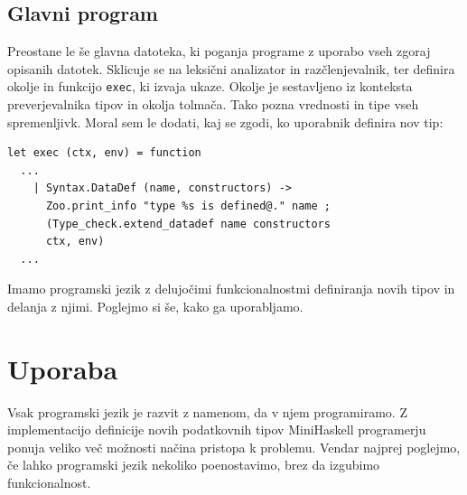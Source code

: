 \documentclass[a4paper,12pt,openright]{book}
\begin{document}
\section{Glavni program}
Preostane le še glavna datoteka, ki poganja programe z uporabo vseh zgoraj opisanih datotek. Sklicuje se na leksični analizator in razčlenjevalnik, ter definira okolje in funkcijo \lstinline{exec}, ki izvaja ukaze. Okolje je sestavljeno 
iz konteksta preverjevalnika tipov in okolja tolmača. Tako pozna vrednosti in tipe vseh spremenljivk. Moral sem le dodati, kaj se zgodi, ko uporabnik definira nov tip:
\begin{lstlisting}
let exec (ctx, env) = function
  ...
    | Syntax.DataDef (name, constructors) ->
      Zoo.print_info "type %s is defined@." name ;
      (Type_check.extend_datadef name constructors 
      ctx, env)
  ...
\end{lstlisting}

Imamo programski jezik z delujočimi funkcionalnostmi definiranja novih tipov in delanja z njimi. Poglejmo si še, kako ga uporabljamo.

\chapter{Uporaba}
Vsak programski jezik je razvit z namenom, da v njem programiramo. Z implementacijo definicije novih podatkovnih tipov MiniHaskell programerju 
ponuja veliko več možnosti načina pristopa k problemu. Vendar najprej poglejmo, če lahko programski jezik nekoliko poenostavimo, brez da izgubimo funkcionalnost. 
\end{document}
